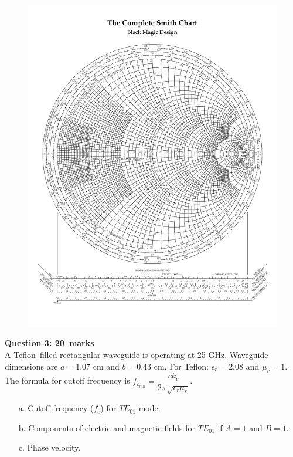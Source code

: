 \documentclass[12pt,a4paper]{article}
\def\Qthree{20}
\begin{document}
\newpage
\begin{figure}[H]
\centering
\vspace{4cm}
\hspace*{-1.6cm}
\includegraphics[scale=1.0,trim=1cm 2cm 1cm 3cm, clip]{./SmithChart}
\label{fig:SmithChart2}
\end{figure}
\newpage
\noindent\textbf{Question 3: \hfill \Qthree~marks}\\
A Teflon--filled rectangular waveguide is operating at 25 GHz. Waveguide dimensions are $a=1.07$ cm and $b=0.43$ cm. For Teflon: $\epsilon_r=2.08$ and $\mu_r=1$. The formula for cutoff frequency is $f_{c_{mn}}=\dfrac{ck_c}{2\pi\sqrt{\epsilon_r\mu_r}}$.
\begin{itemize}
\item[a.] Cutoff frequency ($f_c$) for $TE_{01}$ mode.
\item[b.] Components of electric and magnetic fields for $TE_{01}$ if $A=1$ and $B=1$.
\item[c.] Phase velocity.
\end{itemize}
\end{document}
